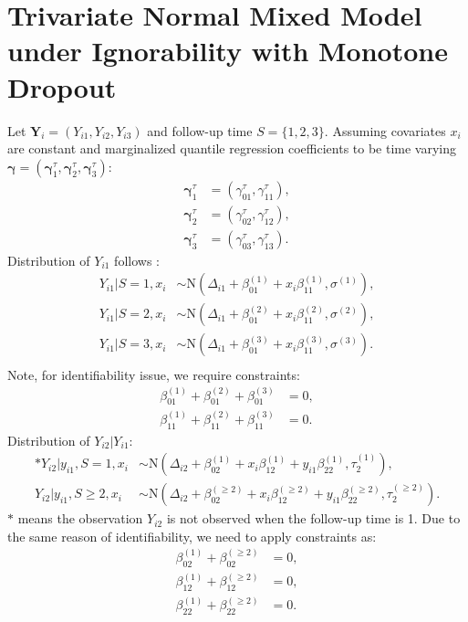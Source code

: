 \documentclass[12pt]{article}
\begin{document}
\section{Trivariate Normal Mixed Model under Ignorability with
  Monotone Dropout}
\label{sec:tri}
Let $\bm Y_i = (Y_{i1}, Y_{i2}, Y_{i3}) $ and follow-up time $S = \{1,
2, 3\}$. Assuming covariates $x_i$ are constant and marginalized
quantile regression coefficients to be time varying $\bm \gamma = (\bm
\gamma_1^{\tau}, \bm \gamma_2^{\tau}, \bm \gamma_3^{\tau})$:
\begin{align*}
  \bm \gamma_1^{\tau} & = (\gamma_{01}^{\tau}, \gamma^{\tau}_{11}), \\
  \bm \gamma_{2}^{\tau} & = (\gamma_{02}^{\tau}, \gamma^{\tau}_{12}), \\
  \bm \gamma_{3}^{\tau} & = (\gamma_{03}^{\tau}, \gamma^{\tau}_{13}).
\end{align*}
Distribution of $Y_{i1}$ follows :
\begin{align}
  \label{eq:tri1}
  Y_{i1}| S = 1, x_i & \sim \textrm{N}(\Delta_{i1} + \beta_{01}^{(1)} + x_i\beta_{11}^{(1)}, \sigma^{(1)}), \\
  Y_{i1}| S = 2, x_i & \sim \textrm{N}(\Delta_{i1} + \beta_{01}^{(2)} + x_i\beta_{11}^{(2)}, \sigma^{(2)}), \\
  Y_{i1}| S = 3, x_i & \sim \textrm{N}(\Delta_{i1} + \beta_{01}^{(3)} + x_i\beta_{11}^{(3)}, \sigma^{(3)}). \\
\end{align}
Note, for identifiability issue, we require constraints:
\begin{align}
  \label{eq:constbi1}
  \beta_{01}^{(1)} + \beta_{01}^{(2)} + \beta_{01}^{(3)}  & = 0 ,\\
  \beta_{11}^{(1)} + \beta_{11}^{(2)} + \beta_{11}^{(3)} & = 0 .
\end{align}
Distribution of $Y_{i2} | Y_{i1}$:
\begin{align}
  \label{eq:tri2}
  * Y_{i2} | y_{i1} , S = 1, x_i & \sim \textrm{N}(\Delta_{i2} + \beta_{02}^{(1)} + x_i\beta_{12}^{(1)} + y_{i1}\beta_{22}^{(1)}, \tau_2^{(1)}),  \\
  Y_{i2} | y_{i1} , S \geq 2, x_i & \sim \textrm{N}(\Delta_{i2} +
  \beta_{02}^{(\geq 2)} + x_i\beta_{12}^{(\geq 2)} +
  y_{i1}\beta_{22}^{(\geq 2)}, \tau_2^{(\geq 2)}).
\end{align}
$*$ means the observation $Y_{i2}$ is not observed when the follow-up
time is 1. Due to the same reason of identifiability, we need to apply
constraints as:
\begin{align}
  \label{eq:constbi2}
  \beta_{02}^{(1)} + \beta_{02}^{(\geq 2)} & = 0 , \\
  \beta_{12}^{(1)} + \beta_{12}^{(\geq 2)} & = 0 , \\
  \beta_{22}^{(1)} + \beta_{22}^{(\geq 2)} & = 0 . \\
\end{align}
\end{document}
